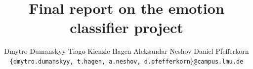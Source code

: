\documentclass[10pt, letterpaper, twocolumn]{article}
\title{Final report on the emotion classifier project}
\author{Dmytro Dumanskyy
\quad
Tiago Kienzle Hagen
\quad
Aleksandar Neshov
\quad
Daniel Pfefferkorn\\
\tt\small\{dmytro.dumanskyy, t.hagen, a.neshov, d.pfefferkorn\}@campus.lmu.de}
\begin{document}
\maketitle






{
    \small
    \nocite{*} %
    
    
}
\end{document}
